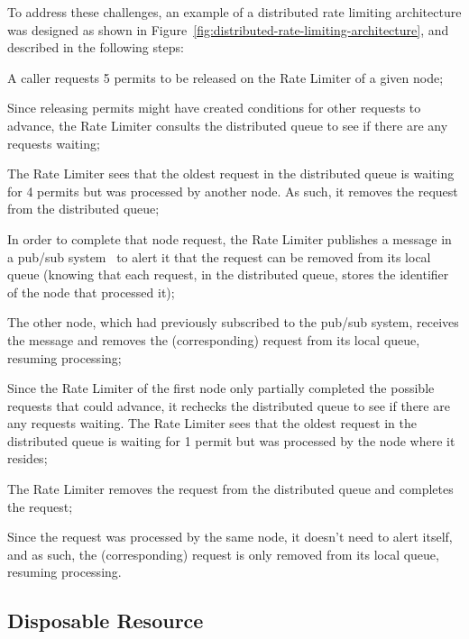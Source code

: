 To address these challenges, an example of a distributed rate limiting architecture was designed as shown in Figure~\ref{fig:distributed-rate-limiting-architecture}, and described in the following steps:

\begin{boldenumerate}
    \item A caller requests 5 permits to be released on the Rate Limiter of a given node;
    \item Since releasing permits might have created conditions for other requests to advance, the Rate Limiter consults the distributed queue to see if there are any requests waiting;
    \item The Rate Limiter sees that the oldest request in the distributed queue is waiting for 4 permits but was processed by another node.
    As such, it removes the request from the distributed queue;
    \item In order to complete that node request, the Rate Limiter publishes a message in a pub/sub system~\cite{microsoft-pub-sub-pattern} to alert it that the request can be removed from its local queue (knowing that each request, in the distributed queue,
    stores the identifier of the node that processed it);
    \item The other node, which had previously subscribed to the pub/sub system, receives the message and removes the (corresponding) request from its local queue, resuming processing;
    \item Since the Rate Limiter of the first node only partially completed the possible requests that could advance, it rechecks the distributed queue to see if there are any requests waiting.
    The Rate Limiter sees that the oldest request in the distributed queue is waiting for 1 permit
    but was processed by the node where it resides;
    \item The Rate Limiter removes the request from the distributed queue and completes the request;
    \item Since the request was processed by the same node, it doesn't need to alert itself, and as such, the (corresponding) request is only removed from its local queue, resuming processing.
\end{boldenumerate}

\subsection{Disposable Resource}\label{subsec:rate-limiter-disposable-resource}

